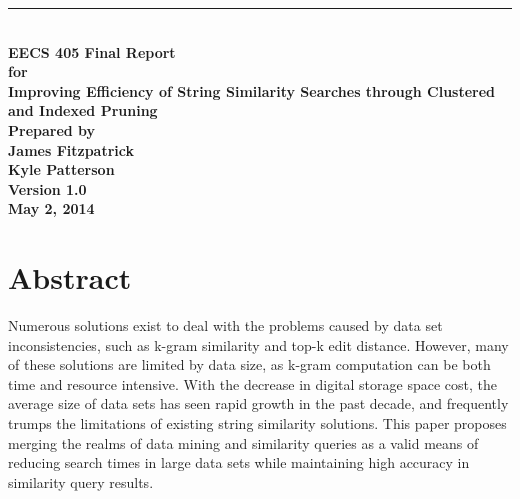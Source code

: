 \documentclass[pdftex,12pt,letter]{article}
\newcommand{\HRule}{\rule{\linewidth}{0.5mm}}
\begin{document}
\begin{titlepage}
\begin{flushright}
\HRule \\[0.4cm]
{ \bfseries
{\huge EECS 405 Final Report\\[1cm]}
{\Large for\\[1cm]}
{\large Improving Efficiency of String Similarity Searches through Clustered and Indexed Pruning\\[3cm]}
{\large Prepared by\\[1cm]James Fitzpatrick\\Kyle Patterson\\[2cm]
Version 1.0\\
May 2, 2014\\
}}
\end{flushright}
\end{titlepage}

\tableofcontents\newpage

\section{Abstract}
Numerous solutions exist to deal with the problems caused by data set inconsistencies, such as k-gram similarity and top-k edit distance. However, many of these solutions are limited by data size, as k-gram computation can be both time and resource intensive. With the decrease in digital storage space cost, the average size of data sets has seen rapid growth in the past decade, and frequently trumps the limitations of existing string similarity solutions. This paper proposes merging the realms of data mining and similarity queries as a valid means of reducing search times in large data sets while maintaining high accuracy in similarity query results.
\end{document}
